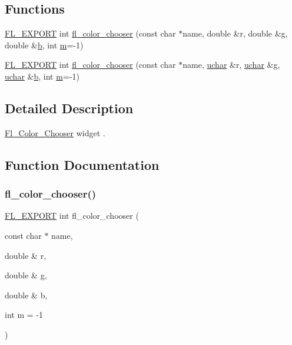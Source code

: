 \subsection*{Functions}
\begin{DoxyCompactItemize}
\item 
\hyperlink{_fl___export_8_h_aa9ba29a18aee9d738370a06eeb4470fc}{F\+L\+\_\+\+E\+X\+P\+O\+RT} int \hyperlink{_fl___color___chooser_8_h_a12b867658f689ffcd6848cda456799a7}{fl\+\_\+color\+\_\+chooser} (const char $\ast$name, double \&r, double \&g, double \&\hyperlink{forms_8_h_a0ba06a290a384fa06b1b90745827dae2}{b}, int \hyperlink{forms_8_h_a2ccd5640c2b2869841c5dab22b937079}{m}=-\/1)
\item 
\hyperlink{_fl___export_8_h_aa9ba29a18aee9d738370a06eeb4470fc}{F\+L\+\_\+\+E\+X\+P\+O\+RT} int \hyperlink{_fl___color___chooser_8_h_ab97a052d90d001d273a9891a34162102}{fl\+\_\+color\+\_\+chooser} (const char $\ast$name, \hyperlink{fl__types_8h_a65f85814a8290f9797005d3b28e7e5fc}{uchar} \&r, \hyperlink{fl__types_8h_a65f85814a8290f9797005d3b28e7e5fc}{uchar} \&g, \hyperlink{fl__types_8h_a65f85814a8290f9797005d3b28e7e5fc}{uchar} \&\hyperlink{forms_8_h_a0ba06a290a384fa06b1b90745827dae2}{b}, int \hyperlink{forms_8_h_a2ccd5640c2b2869841c5dab22b937079}{m}=-\/1)
\end{DoxyCompactItemize}


\subsection{Detailed Description}
\hyperlink{class_fl___color___chooser}{Fl\+\_\+\+Color\+\_\+\+Chooser} widget . 

\subsection{Function Documentation}
\mbox{\label{_fl___color___chooser_8_h_a12b867658f689ffcd6848cda456799a7}} 
\subsubsection{\texorpdfstring{fl\+\_\+color\+\_\+chooser()}{fl\_color\_chooser()}\hspace{0.1cm}{\footnotesize\ttfamily [1/2]}}
{\footnotesize\ttfamily \hyperlink{_fl___export_8_h_aa9ba29a18aee9d738370a06eeb4470fc}{F\+L\+\_\+\+E\+X\+P\+O\+RT} int fl\+\_\+color\+\_\+chooser (\begin{DoxyParamCaption}\item[{const char $\ast$}]{name,  }\item[{double \&}]{r,  }\item[{double \&}]{g,  }\item[{double \&}]{b,  }\item[{int}]{m = {\ttfamily -\/1} }\end{DoxyParamCaption})}

